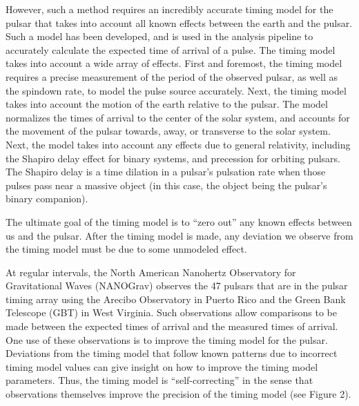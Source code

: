 \documentclass[12pt]{article}
\begin{document}
However, such a method requires an incredibly accurate timing model for the
pulsar that takes into account all known effects between the earth and the
pulsar. Such a model has been developed, and is used in the analysis pipeline to
accurately calculate the expected time of arrival of a pulse. The timing model
takes into account a wide array of effects. First and foremost, the timing model
requires a precise measurement of the period of the observed pulsar, as well as
the spindown rate, to model the pulse source accurately. Next, the timing model
takes into account the motion of the earth relative to the pulsar. The model
normalizes the times of arrival to the center of the solar system, and accounts
for the movement of the pulsar towards, away, or transverse to the solar system.
Next, the model takes into account any effects due to general relativity,
including the Shapiro delay effect for binary systems, and precession for
orbiting pulsars. The Shapiro delay is a time dilation in a pulsar's pulsation rate when those pulses pass near a massive object (in this case, the object being the pulsar's binary companion).

The ultimate goal of the timing model is to ``zero out'' any known effects between
us and the pulsar. After the timing model is made, any deviation we observe from
the timing model must be due to some unmodeled effect.

At regular intervals, the North American Nanohertz Observatory for Gravitational Waves (NANOGrav) observes the 47 pulsars that are in the
pulsar timing array using the Arecibo Observatory in Puerto Rico and the Green Bank Telescope (GBT) in West Virginia. Such observations allow comparisons to be made between the
expected times of arrival and the measured times of arrival. One use of these
observations is to improve the timing model for the pulsar. Deviations from the
timing model that follow known patterns due to incorrect timing model values can
give insight on how to improve the timing model parameters.
Thus, the timing model is ``self-correcting'' in the sense that
observations themselves improve the precision of the timing model (see Figure 2).
\end{document}

